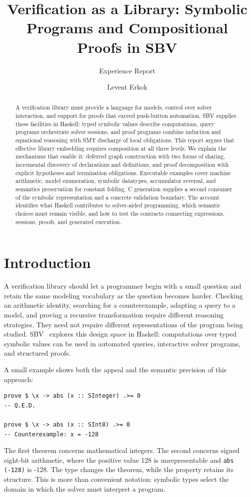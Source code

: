 \documentclass[acmsmall,screen,nonacm]{acmart}
\title[Verification as a Library]{Verification as a Library: Symbolic Programs and Compositional Proofs in SBV}
\subtitle{Experience Report}
\author{Levent Erkok}
\newcommand{\code}[1]{\texttt{#1}}
\begin{document}
\begin{abstract}
A verification library must provide a language for models, control over solver
interaction, and support for proofs that exceed push-button automation. SBV
supplies these facilities in Haskell: typed symbolic values describe
computations, query programs orchestrate solver sessions, and proof programs
combine induction and equational reasoning with SMT discharge of local
obligations. This report argues that effective library embedding requires
composition at all three levels. We explain the mechanisms that enable it:
deferred graph construction with two forms of sharing, incremental discovery
of declarations and definitions, and proof decomposition with explicit
hypotheses and termination obligations. Executable examples cover machine
arithmetic, model enumeration, symbolic datatypes, accumulator reversal, and
semantics preservation for constant folding. C generation supplies a second
consumer of the symbolic representation and a concrete validation boundary.
The account identifies what Haskell contributes to solver-aided programming,
which semantic choices must remain visible, and how to test the contracts
connecting expressions, sessions, proofs, and generated execution.
\end{abstract}

\maketitle

\section{Introduction}
\label{sec:introduction}

A verification library should let a programmer begin with a small question
and retain the same modeling vocabulary as the question becomes harder.
Checking an arithmetic identity, searching for a counterexample, adapting a
query to a model, and proving a recursive transformation require different
reasoning strategies. They need not require different representations of the
program being studied. SBV~\citep{sbv} explores this design space in Haskell:
computations over typed symbolic values can be used in automated queries,
interactive solver programs, and structured proofs.

A small example shows both the appeal and the semantic precision of this
approach:
\begin{lstlisting}
prove $ \x -> abs (x :: SInteger) .>= 0
-- Q.E.D.

prove $ \x -> abs (x :: SInt8) .>= 0
-- Counterexample: x = -128
\end{lstlisting}
The first theorem concerns mathematical integers. The second concerns signed
eight-bit arithmetic, where the positive value 128 is unrepresentable and
\code{abs (-128)} is -128. The type changes the theorem, while the property
retains its structure. This is more than convenient notation: symbolic types
select the domain in which the solver must interpret a program.
\end{document}
